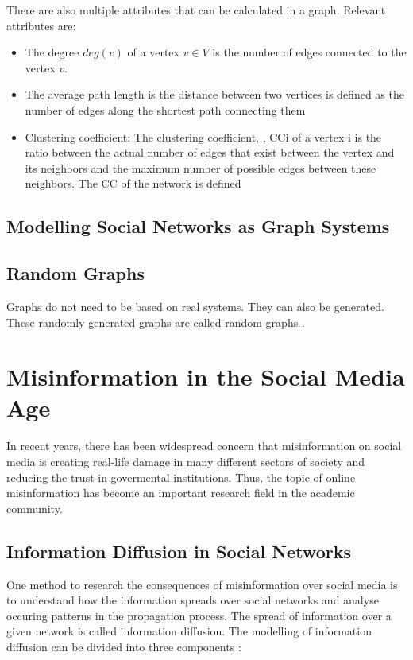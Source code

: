 There are also multiple attributes that can be calculated in a graph. 
Relevant attributes are:
\begin{itemize}
    \item The degree $deg(v)$ of a vertex $v \in V$ is the number of edges connected to the
    vertex $v$. 
    \item The average path length is the distance between two vertices is
    defined as the number of edges along the shortest path
    connecting them %
    \item Clustering coefficient: The clustering coefficient, , CCi
    of a vertex i
     is the ratio between the actual number of edges
    that exist between the vertex and its neighbors and the
    maximum number of possible edges between these
    neighbors. The
    CC
    of the network is defined %
\end{itemize}

\subsection{Modelling Social Networks as Graph Systems}


\subsection{Random Graphs}

Graphs do not need to be based on real systems. They can also be generated. 
These randomly generated graphs are called random graphs \cite{randomgraphs}.



\section{Misinformation in the Social Media Age}

In recent years, there has been widespread concern that 
misinformation on social media is creating real-life damage in 
many different sectors of society and reducing the trust in govermental
institutions. Thus, the topic of online misinformation has become an 
important research field in the academic community.

\subsection{Information Diffusion in Social Networks}

One method to research the consequences of misinformation over social media
is to understand how the information spreads over
social networks and analyse occuring patterns in the propagation process. 
The spread of information over a given network is called
information diffusion. 
The modelling of information diffusion can be divided into three components
\cite{reviewinformationdiffusion}: 

